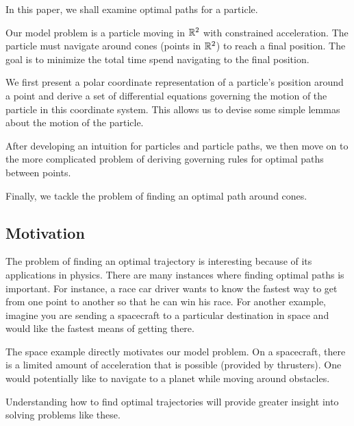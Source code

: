 In this paper, we shall examine optimal paths for a particle.

Our model problem is a particle moving in $\mathbb R^2$ with constrained acceleration. The particle must navigate around cones (points in $\mathbb R^2$) to reach a final position. The goal is to minimize the total time spend navigating to the final position. 

We first present a polar coordinate representation of a particle's position around a point and derive a set of differential equations governing the motion of the particle in this coordinate system. This allows us to devise some simple lemmas about the motion of the particle.

After developing an intuition for particles and particle paths, we then move on to the more complicated problem of deriving governing rules for optimal paths between points.

Finally, we tackle the problem of finding an optimal path around cones.

\subsection{Motivation}

The problem of finding an optimal trajectory is interesting because of its applications in physics. There are many instances where finding optimal paths is important. For instance, a race car driver wants to know the fastest way to get from one point to another so that he can win his race. For another example, imagine you are sending a spacecraft to a particular destination in space and would like the fastest means of getting there.

The space example directly motivates our model problem. On a spacecraft, there is a limited amount of acceleration that is possible (provided by thrusters). One would potentially like to navigate to a planet while moving around obstacles. 

Understanding how to find optimal trajectories will provide greater insight into solving problems like these.
